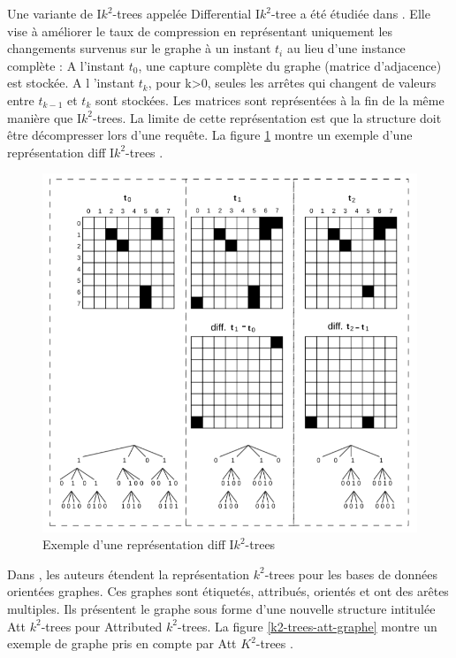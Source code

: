 Une variante de I$k^2$-trees appelée Differential I$k^2$-tree a été étudiée dans \citep{alvarez2017succinct}. Elle vise à améliorer le taux de compression en représentant uniquement les changements survenus sur le graphe à un instant $t_i$ au lieu d'une instance complète : A l'instant $t_0$, une capture complète du graphe (matrice d'adjacence) est stockée. A l 'instant $t_k$, pour k>0, seules les arrêtes qui changent de valeurs entre $t_{k-1}$ et $t_k$ sont stockées. Les matrices sont représentées à la fin de la même manière que I$k^2$-trees. La limite de cette représentation est que la structure doit être décompresser lors d'une requête.
La figure \ref{Ik2-trees-diff} montre un exemple d'une représentation diff I$k^2$-trees \citep{alvarez2017succinct}.

\begin{figure}[H]
\begin{center}
\includegraphics[height=200 pt, width=380 pt]{./ressources/image/Ik2-trees-diff.png} 
\end{center}
\caption{Exemple d'une représentation diff I$k^2$-trees}
\label{Ik2-trees-diff}
\end{figure}

Dans \citep{alvarez2018compact}, les auteurs étendent la représentation $k^2$-trees pour les bases de données orientées graphes. Ces graphes sont étiquetés, attribués, orientés et ont des arêtes multiples. Ils présentent le graphe sous forme d'une nouvelle structure intitulée Att $k^2$-trees pour Attributed $k^2$-trees.
La figure \ref{k2-trees-att-graphe} montre un exemple de graphe pris en compte par Att $K^2$-trees \citep{alvarez2018compact}.

